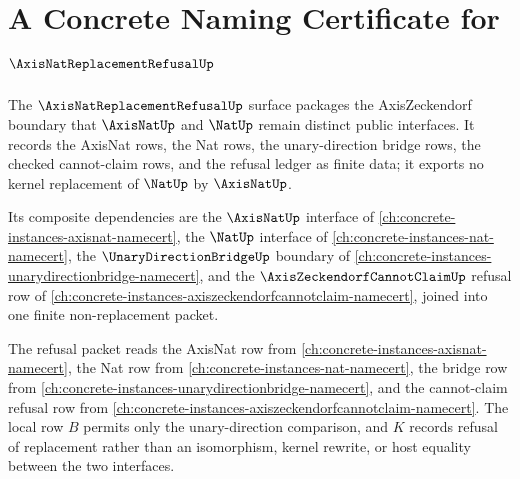 \chapter{A Concrete Naming Certificate for $\AxisNatReplacementRefusalUp$}
\label{ch:concrete-instances-axisnat-replacement-refusal-namecert}

The $\AxisNatReplacementRefusalUp$ surface packages the AxisZeckendorf boundary that $\AxisNatUp$ and $\NatUp$ remain distinct public interfaces. It records the AxisNat rows, the Nat rows, the unary-direction bridge rows, the checked cannot-claim rows, and the refusal ledger as finite data; it exports no kernel replacement of $\NatUp$ by $\AxisNatUp$.

Its composite dependencies are the $\AxisNatUp$ interface of \autoref{ch:concrete-instances-axisnat-namecert}, the $\NatUp$ interface of \autoref{ch:concrete-instances-nat-namecert}, the $\UnaryDirectionBridgeUp$ boundary of \autoref{ch:concrete-instances-unarydirectionbridge-namecert}, and the $\AxisZeckendorfCannotClaimUp$ refusal row of \autoref{ch:concrete-instances-axiszeckendorfcannotclaim-namecert}, joined into one finite non-replacement packet.

The refusal packet reads the AxisNat row from \autoref{ch:concrete-instances-axisnat-namecert}, the Nat row from \autoref{ch:concrete-instances-nat-namecert}, the bridge row from \autoref{ch:concrete-instances-unarydirectionbridge-namecert}, and the cannot-claim refusal row from \autoref{ch:concrete-instances-axiszeckendorfcannotclaim-namecert}. The local row $B$ permits only the unary-direction comparison, and $K$ records refusal of replacement rather than an isomorphism, kernel rewrite, or host equality between the two interfaces.

